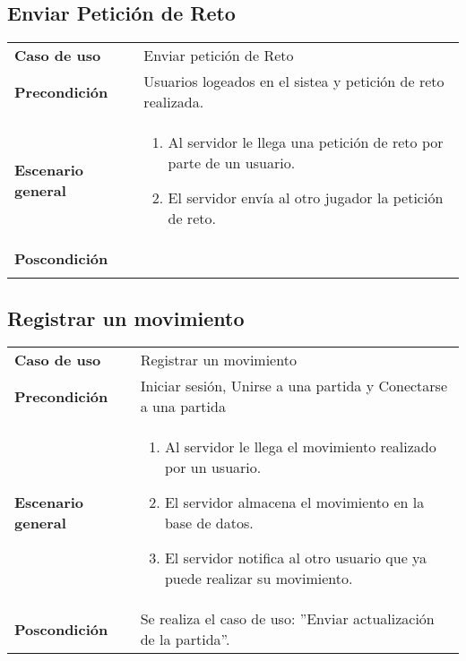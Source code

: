 \subsection{Enviar Petición de Reto}

{\footnotesize
\begin{tabularx}{0.95\textwidth}{p{}|X}

\textbf{Caso de uso} & Enviar petición de Reto\\

\textbf{Precondición} & Usuarios logeados en el sistea y petición de reto realizada. \\

\textbf{Escenario general} & \begin{enumerate}

\item Al servidor le llega una petición de reto por parte de un usuario.
\item El servidor envía al otro jugador la petición de reto.

\end{enumerate} \\

\textbf{Poscondición} &  \\ \\

\end{tabularx}
}

\subsection{Registrar un movimiento}

{\footnotesize
\begin{tabularx}{0.95\textwidth}{p{}|X}

\textbf{Caso de uso} & Registrar un movimiento \\

\textbf{Precondición} & Iniciar sesión, Unirse a una partida y Conectarse a una
partida \\

\textbf{Escenario general} & \begin{enumerate}
\item Al servidor le llega el movimiento realizado por un usuario.
\item El servidor almacena el movimiento en la base de datos.
\item El servidor notifica al otro usuario que ya puede realizar su movimiento.
\end{enumerate} \\

\textbf{Poscondición} & Se realiza el caso de uso: ''Enviar actualización de la
partida''.\\

\end{tabularx}
}

